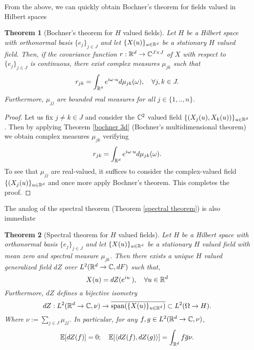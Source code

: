 \documentclass[12pt]{article}
\newtheorem{theorem}{Theorem}
\newcommand{\br}[1]{\left\langle#1\right\rangle}
\begin{document}
From the above, we can quickly obtain Bochner's theorem for fields valued in Hilbert spaces
\begin{theorem}[Bochner's theorem for $H$ valued fields]\label{bochner hilbert}
	Let $H$ be a Hilbert space with orthonormal basis $\{e_j\}_{j\in J}$ and let $\{X(u)\}_{u\in{\mathbb R}^d}$ be a stationary $H$ valued field. Then, if the covariance function $r:{\mathbb R}^d\to \mathbb{C}^{J\times J}$ of $X$ with respect to $\{e_j\}_{j\in J}$  is continuous, there exist complex measures $\mu_{jk}$ such that
	\begin{equation*}
		r_{jk}=\int_{{\mathbb R}^d} e^{i\omega \cdot u} d\mu _{j k}(\omega),\quad \forall j,k\in{J}.
	\end{equation*}
	Furthermore, $\mu_{jj}$ are bounded real measures for all $j\in\{1,..,n\}$.
\end{theorem}
\begin{proof}
	Let us fix $j\neq k\in J$ and consider the $\mathbb{C}^2$ valued field $\{(X_j(u),X_k(u))\}_{u\in{\mathbb R}^d}$. Then by applying Theorem \ref{bochner 3d} (Bochner's multidimensional theorem) we obtain complex measures $\mu_{jk}$ verifying
	\begin{equation*}
		r_{jk}=\int_{{\mathbb R}^d} e^{i\omega \cdot u} d\mu _{j k}(\omega).
	\end{equation*}
	To  see that $\mu_{jj}$ are real-valued, it suffices to consider the complex-valued field $\{(X_j(u)\}_{u\in{\mathbb R}^d}$ and once more apply Bochner's theorem. This completes the proof.
\end{proof}
The analog of the spectral theorem (Theorem \ref{spectral theorem}) is also immediate
\begin{theorem}[Spectral theorem for $H$ valued fields]\label{spectral theorem hilbert}
	Let $H$ be a Hilbert space with orthonormal basis $\{e_j\}_{j\in J}$ and let $\{X(u)\}_{u\in{\mathbb R}^d}$ be a stationary $H$ valued field with mean zero and spectral measure $\mu_{jk}$. Then there exists a unique $H$ valued generalized field $dZ$ over $L^2({\mathbb R}^d\to \mathbb{C},dF)$ such that,
	\begin{equation}\label{spectral representation2}
		X(u)=dZ(e^{iu\cdot}),\quad\forall u\in{\mathbb R}^d
	\end{equation}
	Furthermore, $dZ$ defines a bijective isometry
	\begin{equation*}
		dZ:L^2({\mathbb R}^d\to \mathbb{C},\nu)\to\overline{\text{span}(\{X(u)\}_{u\in{\mathbb R}^d})}\subset L^2(\Omega\to H).
	\end{equation*}
	Where $\nu:=\sum_{j\in J} \mu_{jj}$.
	In particular, for any $f,g\in L^2({\mathbb R}^d\to\mathbb{C},\nu)$,
	\begin{equation}\label{dZ properties2}
		\E[dZ(f)]=0;\quad\E[\br{dZ(f),{dZ(g)}}]=\int_{\R^d} f\overline{g}\nu.
	\end{equation}
\end{theorem}
\end{document}
